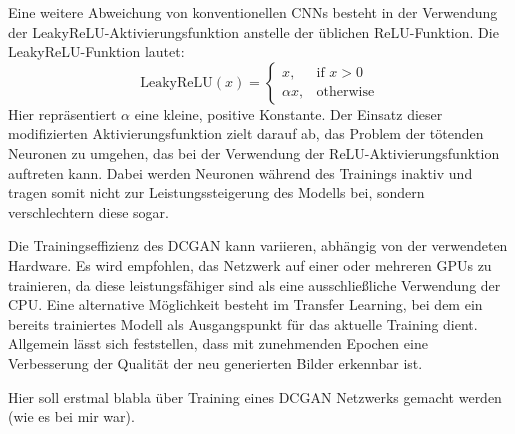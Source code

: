 Eine weitere Abweichung von konventionellen CNNs besteht in der Verwendung der LeakyReLU-Aktivierungsfunktion anstelle der üblichen ReLU-Funktion. Die LeakyReLU-Funktion lautet:
\[
\text{LeakyReLU}(x) = \begin{cases}
	x, & \text{if } x > 0 \\
	\alpha x, & \text{otherwise}
\end{cases}
\]
Hier repräsentiert $\alpha$ eine kleine, positive Konstante. Der Einsatz dieser modifizierten Aktivierungsfunktion zielt darauf ab, das Problem der \glqq tötenden Neuronen\grqq{} zu umgehen, das bei der Verwendung der ReLU-Aktivierungsfunktion auftreten kann. Dabei werden Neuronen während des Trainings inaktiv und tragen somit nicht zur Leistungssteigerung des Modells bei, sondern verschlechtern diese sogar.

Die Trainingseffizienz des DCGAN kann variieren, abhängig von der verwendeten Hardware. Es wird empfohlen, das Netzwerk auf einer oder mehreren GPUs zu trainieren, da diese leistungsfähiger sind als eine ausschließliche Verwendung der CPU. Eine alternative Möglichkeit besteht im Transfer Learning, bei dem ein bereits trainiertes Modell als Ausgangspunkt für das aktuelle Training dient. Allgemein lässt sich feststellen, dass mit zunehmenden Epochen eine Verbesserung der Qualität der neu generierten Bilder erkennbar ist.

\begin{table}[h]
	\centering
	\renewcommand{\arraystretch}{1.5}
	\caption{Hyperparameter eines DCGAN-Trainings bezüglich der angegebenen Datensätze}
	\label{tab:dcgan}
\end{table}

Hier soll erstmal blabla über Training eines DCGAN Netzwerks gemacht werden (wie es bei mir war).

